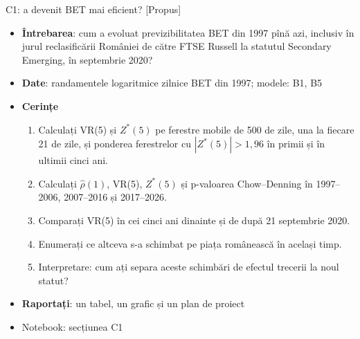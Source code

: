 \begin{frame}{C1: a devenit BET mai eficient? [Propus]}
\itemsize{\footnotesize}
\begin{itemize}
\item \textbf{Întrebarea}: cum a evoluat previzibilitatea BET din 1997 pînă azi, inclusiv în jurul reclasificării României de către FTSE Russell la statutul Secondary Emerging, în septembrie 2020?
\item \textbf{Date}: randamentele logaritmice zilnice BET din 1997; modele: B1, B5
\item \textbf{Cerințe}
\begin{enumerate}
    \item Calculați VR(5) și $Z^*(5)$ pe ferestre mobile de 500 de zile, una la fiecare 21 de zile, și ponderea ferestrelor cu $|Z^*(5)| > 1{,}96$ în primii și în ultimii cinci ani.
    \item Calculați $\hat\rho(1)$, VR(5), $Z^*(5)$ și p-valoarea Chow--Denning în 1997--2006, 2007--2016 și 2017--2026.
    \item Comparați VR(5) în cei cinci ani dinainte și de după 21 septembrie 2020.
    \item Enumerați ce altceva s-a schimbat pe piața românească în același timp.
    \item Interpretare: cum ați separa aceste schimbări de efectul trecerii la noul statut?
\end{enumerate}
\item \textbf{Raportați}: un tabel, un grafic și un plan de proiect
\item Notebook: secțiunea C1
\end{itemize}
\end{frame}


